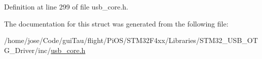 Definition at line 299 of file usb\-\_\-core.\-h.



The documentation for this struct was generated from the following file\-:\begin{DoxyCompactItemize}
\item 
/home/jose/\-Code/gui\-Tau/flight/\-Pi\-O\-S/\-S\-T\-M32\-F4xx/\-Libraries/\-S\-T\-M32\-\_\-\-U\-S\-B\-\_\-\-O\-T\-G\-\_\-\-Driver/inc/\hyperlink{_s_t_m32_f4xx_2_libraries_2_s_t_m32___u_s_b___o_t_g___driver_2inc_2usb__core_8h}{usb\-\_\-core.\-h}\end{DoxyCompactItemize}
